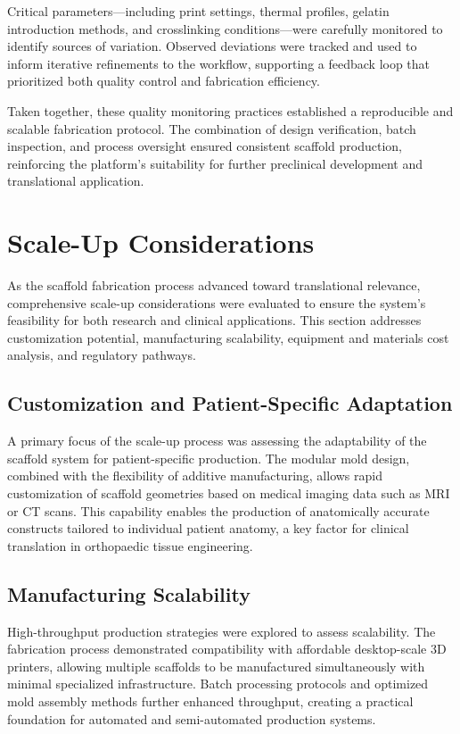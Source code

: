 Critical parameters—including print settings, thermal profiles, gelatin introduction methods, and crosslinking conditions—were carefully monitored to identify sources of variation. Observed deviations were tracked and used to inform iterative refinements to the workflow, supporting a feedback loop that prioritized both quality control and fabrication efficiency.

Taken together, these quality monitoring practices established a reproducible and scalable fabrication protocol. The combination of design verification, batch inspection, and process oversight ensured consistent scaffold production, reinforcing the platform's suitability for further preclinical development and translational application.

\section{Scale-Up Considerations}

As the scaffold fabrication process advanced toward translational relevance, comprehensive scale-up considerations were evaluated to ensure the system's feasibility for both research and clinical applications. This section addresses customization potential, manufacturing scalability, equipment and materials cost analysis, and regulatory pathways.

\subsection{Customization and Patient-Specific Adaptation}

A primary focus of the scale-up process was assessing the adaptability of the scaffold system for patient-specific production. The modular mold design, combined with the flexibility of additive manufacturing, allows rapid customization of scaffold geometries based on medical imaging data such as MRI or CT scans. This capability enables the production of anatomically accurate constructs tailored to individual patient anatomy, a key factor for clinical translation in orthopaedic tissue engineering.

\subsection{Manufacturing Scalability}

High-throughput production strategies were explored to assess scalability. The fabrication process demonstrated compatibility with affordable desktop-scale 3D printers, allowing multiple scaffolds to be manufactured simultaneously with minimal specialized infrastructure. Batch processing protocols and optimized mold assembly methods further enhanced throughput, creating a practical foundation for automated and semi-automated production systems. 

